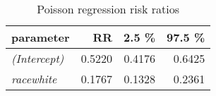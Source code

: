 \begin{wraptable}{r}{2.5in}

\caption{\label{tab:poisson_reg_RR}Poisson regression risk ratios}
\centering
\fontsize{9}{11}\selectfont
\begin{tabular}[t]{>{}lrrr}
\toprule
parameter & RR & 2.5 \% & 97.5 \%\\
\midrule
\em{(Intercept)} & 0.5220 & 0.4176 & 0.6425\\
\em{racewhite} & 0.1767 & 0.1328 & 0.2361\\
\bottomrule
\end{tabular}
\end{wraptable}
